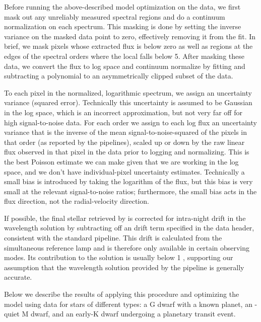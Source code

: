 \documentclass[twocolumn]{aastex62}
\begin{document}
Before running the above-described model optimization on the data, we first mask out any unreliably measured spectral regions and do a continuum normalization on each spectrum. 
This masking is done by setting the inverse variance on the masked data point to zero, effectively removing it from the fit. 
In brief, we mask pixels whose extracted flux is below zero as well as regions at the edges of the spectral orders where the local \SNR falls below 5. 
After masking these data, we convert the flux to log space and continuum normalize by fitting and subtracting a polynomial to an asymmetrically clipped subset of the data. 

To each pixel in the normalized, logarithmic spectrum, we assign an uncertainty variance (squared error).
Technically this uncertainty is assumed to be Gaussian in the log space, which is an incorrect approximation, but not very far off for high signal-to-noise data. 
For each order we assign to each log flux an uncertainty variance that is the inverse of the mean signal-to-noise-squared of the pixels in that order (as reported by the \HARPS pipelines), scaled up or down by the raw linear flux observed in that pixel in the data prior to logging and normalizing. 
This is the best Poisson estimate we can make given that we are working in the log space, and we don't have individual-pixel uncertainty estimates. 
Technically a small bias is introduced by taking the logarithm of the flux, but this bias is very small at the relevant signal-to-noise ratios; furthermore, the small bias acts in the flux direction, not the radial-velocity direction.

If possible, the final stellar \RV retrieved by \wobble is corrected for intra-night drift in the wavelength solution by subtracting off an \RV drift term specified in the data header, consistent with the standard \HARPS pipeline. 
This drift is calculated from the simultaneous reference lamp and is therefore only available in certain observing modes. 
Its contribution to the \RV solution is usually below 1 \ms, supporting our assumption that the wavelength solution provided by the \HARPS pipeline is generally accurate.

Below we describe the results of applying this procedure and optimizing the \wobble model using \HARPS data for stars of different types: a G dwarf with a known planet, an \RV-quiet M dwarf, and an early-K dwarf undergoing a planetary transit event.
\end{document}
